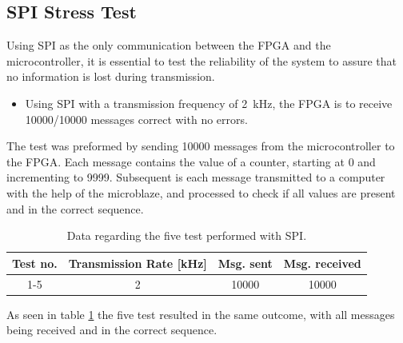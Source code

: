 \documentclass[../../main.tex]{subfiles}
\begin{document}
\subsection{SPI Stress Test}
Using SPI as the only communication between the FPGA and the microcontroller, it is essential to test the reliability of the system to assure that no information is lost during transmission. 
\begin{itemize}
    \item Using SPI with a transmission frequency of \SI{2}{\kilo\hertz}, the FPGA is to receive 10000/10000 messages correct with no errors.
\end{itemize}
The test was preformed by sending 10000 messages from the microcontroller to the FPGA. Each message contains the value of a counter, starting at 0 and incrementing to 9999. Subsequent is each message transmitted to a computer with the help of the microblaze, and processed to check if all values are present and in the correct sequence.    
\begin{table}[H]
\centering
\begin{tabular}{c|c|c|c}
Test no. & Transmission Rate {[}kHz{]} & Msg. sent & Msg. received \\ \hline
1-5 & 2 & 10000 & 10000
\end{tabular}
\caption{Data regarding the five test performed with SPI.}
\label{tab:SPI-stresstest}
\end{table}

As seen in table \ref{tab:SPI-stresstest} the five test resulted in the same outcome, with all messages being received and in the correct sequence. 
\end{document}
